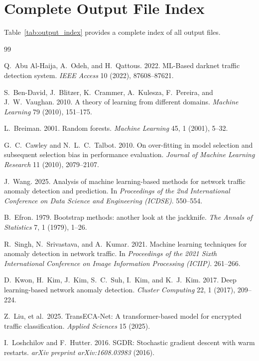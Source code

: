 \documentclass[sigconf]{acmart}
\begin{document}
\section{Complete Output File Index} Table~\ref{tab:output_index} provides a complete index of all output files.

\afterpage{\clearpage}
\begin{thebibliography}{99}

Q.\ Abu Al-Haija, A.\ Odeh, and H.\ Qattous. 2022. ML-Based darknet traffic detection system. \textit{IEEE Access} 10 (2022), 87608--87621.

S.\ Ben-David, J.\ Blitzer, K.\ Crammer, A.\ Kulesza, F.\ Pereira, and J.\ W.\ Vaughan. 2010. A theory of learning from different domains. \textit{Machine Learning} 79 (2010), 151--175.

L.\ Breiman. 2001. Random forests. \textit{Machine Learning} 45, 1 (2001), 5--32.

G.\ C.\ Cawley and N.\ L.\ C.\ Talbot. 2010. On over-fitting in model selection and subsequent selection bias in performance evaluation. \textit{Journal of Machine Learning Research} 11 (2010), 2079--2107.

J.\ Wang. 2025. Analysis of machine learning-based methods for network traffic anomaly detection and prediction. In \textit{Proceedings of the 2nd International Conference on Data Science and Engineering (ICDSE)}. 550--554.

B.\ Efron. 1979. Bootstrap methods: another look at the jackknife. \textit{The Annals of Statistics} 7, 1 (1979), 1--26.

R.\ Singh, N.\ Srivastava, and A.\ Kumar. 2021. Machine learning techniques for anomaly detection in network traffic. In \textit{Proceedings of the 2021 Sixth International Conference on Image Information Processing (ICIIP)}. 261--266.

D.\ Kwon, H.\ Kim, J.\ Kim, S.\ C.\ Suh, I.\ Kim, and K.\ J.\ Kim. 2017. Deep learning-based network anomaly detection. \textit{Cluster Computing} 22, 1 (2017), 209--224.

Z.\ Liu, et al.\ 2025. TransECA-Net: A transformer-based model for encrypted traffic classification. \textit{Applied Sciences} 15 (2025).

I.\ Loshchilov and F.\ Hutter. 2016. SGDR: Stochastic gradient descent with warm restarts. \textit{arXiv preprint arXiv:1608.03983} (2016).


\end{thebibliography}
\end{document}
